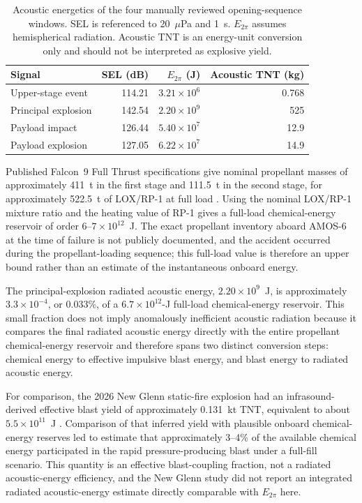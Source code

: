 \documentclass[]{seismica}
\begin{document}
\begin{table}[!tbp]
\centering
\small
\caption{Acoustic energetics of the four manually reviewed opening-sequence
windows. SEL is referenced to 20~$\mu$Pa and 1~s. $E_{2\pi}$ assumes
hemispherical radiation. Acoustic TNT is an energy-unit conversion only and
should not be interpreted as explosive yield.}
\label{tab:supp_energetics}
\begin{tabularx}{\textwidth}{Xrrr}
\hline
Signal & SEL (dB) & $E_{2\pi}$ (J) & Acoustic TNT (kg) \\
\hline
Upper-stage event   & 114.21 & $3.21\times10^6$ & 0.768 \\
Principal explosion & 142.54 & $2.20\times10^9$ & 525   \\
Payload impact      & 126.44 & $5.40\times10^7$ & 12.9  \\
Payload explosion   & 127.05 & $6.22\times10^7$ & 14.9  \\
\hline
\end{tabularx}
\end{table}

Published Falcon~9 Full Thrust specifications give nominal propellant masses
of approximately 411~t in the first stage and 111.5~t in the second stage,
for approximately 522.5~t of LOX/RP-1 at full load
\citep{TODO_FALCON9_DATASHEET}. Using the nominal LOX/RP-1 mixture ratio and
the heating value of RP-1 gives a full-load chemical-energy reservoir of order
$6$--$7\times10^{12}$~J. The exact propellant inventory aboard AMOS-6 at the
time of failure is not publicly documented, and the accident occurred during
the propellant-loading sequence; this full-load value is therefore an upper
bound rather than an estimate of the instantaneous onboard energy.

The principal-explosion radiated acoustic energy,
$2.20\times10^9$~J, is approximately $3.3\times10^{-4}$, or 0.033\%, of a
$6.7\times10^{12}$-J full-load chemical-energy reservoir. This small fraction
does not imply anomalously inefficient acoustic radiation because it compares
the final radiated acoustic energy directly with the entire propellant
chemical-energy reservoir and therefore spans two distinct conversion steps:
chemical energy to effective impulsive blast energy, and blast energy to
radiated acoustic energy.

For comparison, the 2026 New Glenn static-fire explosion had an
infrasound-derived effective blast yield of approximately 0.131~kt TNT,
equivalent to about $5.5\times10^{11}$~J
\citep{silber_scamfer_newglenn_2026}. Comparison of that inferred yield with
plausible onboard chemical-energy reserves led
\citet{silber_scamfer_newglenn_2026} to estimate that approximately 3--4\%
of the available chemical energy participated in the rapid pressure-producing
blast under a full-fill scenario. This quantity is an effective blast-coupling
fraction, not a radiated acoustic-energy efficiency, and the New Glenn study
did not report an integrated radiated acoustic-energy estimate directly
comparable with $E_{2\pi}$ here.
\end{document}
